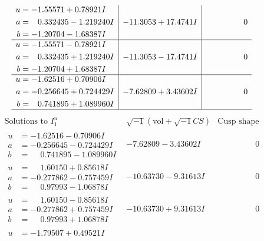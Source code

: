 \documentclass[1p]{elsarticle_modified}
\theoremstyle{definition}
\newcommand{\I}{\sqrt{-1}}
\begin{document}
$$\begin{array}{c|c|c}
\begin{aligned}
u &= -1.55571 + 0.78921 I \\
a &= \phantom{-}0.332435 - 1.219240 I \\
b &= -1.20704 - 1.68387 I\end{aligned}
 & -11.3053 + 17.4741 I & \phantom{-0.000000 } 0 \\ \hline\begin{aligned}
u &= -1.55571 - 0.78921 I \\
a &= \phantom{-}0.332435 + 1.219240 I \\
b &= -1.20704 + 1.68387 I\end{aligned}
 & -11.3053 - 17.4741 I & \phantom{-0.000000 } 0 \\ \hline\begin{aligned}
u &= -1.62516 + 0.70906 I \\
a &= -0.256645 + 0.724429 I \\
b &= \phantom{-}0.741895 + 1.089960 I\end{aligned}
 & -7.62809 + 3.43602 I & \phantom{-0.000000 } 0\\
 \hline 
 \end{array}$$\newpage$$\begin{array}{c|c|c}  
\text{Solutions to }I^u_{1}& \I (\text{vol} + \sqrt{-1}CS) & \text{Cusp shape}\\
 \hline 
\begin{aligned}
u &= -1.62516 - 0.70906 I \\
a &= -0.256645 - 0.724429 I \\
b &= \phantom{-}0.741895 - 1.089960 I\end{aligned}
 & -7.62809 - 3.43602 I & \phantom{-0.000000 } 0 \\ \hline\begin{aligned}
u &= \phantom{-}1.60150 + 0.85618 I \\
a &= -0.277862 - 0.757459 I \\
b &= \phantom{-}0.97993 - 1.06878 I\end{aligned}
 & -10.63730 - 9.31613 I & \phantom{-0.000000 } 0 \\ \hline\begin{aligned}
u &= \phantom{-}1.60150 - 0.85618 I \\
a &= -0.277862 + 0.757459 I \\
b &= \phantom{-}0.97993 + 1.06878 I\end{aligned}
 & -10.63730 + 9.31613 I & \phantom{-0.000000 } 0 \\ \hline\begin{aligned}
u &= -1.79507 + 0.49521 I \\

\end{aligned}
\end{array}$$
\end{document}
